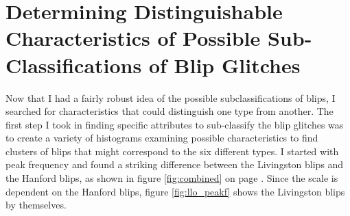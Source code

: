 \documentclass[a4paper]{article}
\begin{document}
\section{Determining Distinguishable Characteristics of Possible Sub-Classifications of Blip Glitches} \label{plots}

Now that I had a fairly robust idea of the possible subclassifications of blips, I searched for characteristics that could distinguish one type from another. The first step I took in finding specific attributes to sub-classify the blip glitches was to create a variety of histograms examining possible characteristics to find clusters of blips that might correspond to the six different types. I started with peak frequency and found a striking difference between the Livingston blips and the Hanford blips, as shown in figure \ref{fig:combined} on page \pageref{fig:combined_peakf}. Since the scale is dependent on the Hanford blips, figure \ref{fig:llo_peakf} shows the Livingston blips by themselves.
\end{document}

